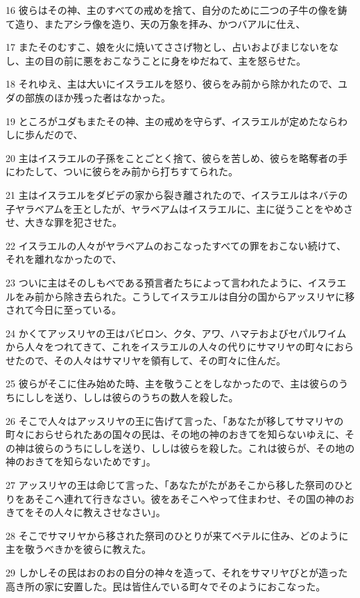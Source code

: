 \par 16 彼らはその神、主のすべての戒めを捨て、自分のために二つの子牛の像を鋳て造り、またアシラ像を造り、天の万象を拝み、かつバアルに仕え、
\par 17 またそのむすこ、娘を火に焼いてささげ物とし、占いおよびまじないをなし、主の目の前に悪をおこなうことに身をゆだねて、主を怒らせた。
\par 18 それゆえ、主は大いにイスラエルを怒り、彼らをみ前から除かれたので、ユダの部族のほか残った者はなかった。
\par 19 ところがユダもまたその神、主の戒めを守らず、イスラエルが定めたならわしに歩んだので、
\par 20 主はイスラエルの子孫をことごとく捨て、彼らを苦しめ、彼らを略奪者の手にわたして、ついに彼らをみ前から打ちすてられた。
\par 21 主はイスラエルをダビデの家から裂き離されたので、イスラエルはネバテの子ヤラベアムを王としたが、ヤラベアムはイスラエルに、主に従うことをやめさせ、大きな罪を犯させた。
\par 22 イスラエルの人々がヤラベアムのおこなったすべての罪をおこない続けて、それを離れなかったので、
\par 23 ついに主はそのしもべである預言者たちによって言われたように、イスラエルをみ前から除き去られた。こうしてイスラエルは自分の国からアッスリヤに移されて今日に至っている。
\par 24 かくてアッスリヤの王はバビロン、クタ、アワ、ハマテおよびセパルワイムから人々をつれてきて、これをイスラエルの人々の代りにサマリヤの町々におらせたので、その人々はサマリヤを領有して、その町々に住んだ。
\par 25 彼らがそこに住み始めた時、主を敬うことをしなかったので、主は彼らのうちにししを送り、ししは彼らのうちの数人を殺した。
\par 26 そこで人々はアッスリヤの王に告げて言った、「あなたが移してサマリヤの町々におらせられたあの国々の民は、その地の神のおきてを知らないゆえに、その神は彼らのうちにししを送り、ししは彼らを殺した。これは彼らが、その地の神のおきてを知らないためです」。
\par 27 アッスリヤの王は命じて言った、「あなたがたがあそこから移した祭司のひとりをあそこへ連れて行きなさい。彼をあそこへやって住まわせ、その国の神のおきてをその人々に教えさせなさい」。
\par 28 そこでサマリヤから移された祭司のひとりが来てベテルに住み、どのように主を敬うべきかを彼らに教えた。
\par 29 しかしその民はおのおの自分の神々を造って、それをサマリヤびとが造った高き所の家に安置した。民は皆住んでいる町々でそのようにおこなった。
